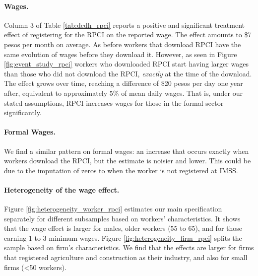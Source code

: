 \documentclass[oneside,11pt]{article}
\begin{document}
\paragraph{Wages.} Column 3 of Table \ref{tab:dcdh_rpci} reports a positive and significant treatment effect of registering for the RPCI on the reported wage. The effect amounts to \$7 pesos per month on average. As before workers that download RPCI have the same evolution of wages before they download it. However, as seen in Figure \ref{fig:event_study_rpci} workers who downloaded RPCI start having larger wages than those who did not download the RPCI, \textit{exactly} at the time of the download. The effect grows over time, reaching a difference of \$20 pesos per day one year after, equivalent to approximately 5\% of mean daily wages. That is, under our stated assumptions, RPCI increases wages for those in the formal sector significantly.

\paragraph{Formal Wages.} We find a similar pattern on formal wages: an increase that occurs exactly when workers download the RPCI, but the estimate is noisier and lower. This could be due to the imputation of zeros to when the worker is not registered at IMSS. 

\paragraph{Heterogeneity of the wage effect.} Figure \ref{fig:heterogeneity_worker_rpci} estimates our main specification separately for different subsamples based on workers' characteristics. It shows that the wage effect is larger for males, older workers (55 to 65), and for those earning 1 to 3 minimum wages. Figure \ref{fig:heterogeneity_firm_rpci} splits the sample based on firm's characteristics. We find that the effects are larger for firms that registered agriculture and construction as their industry, and also for small firms (<50 workers).

\end{document}

